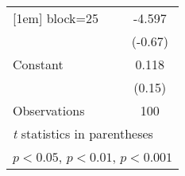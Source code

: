 {\begin{longtable}{l*{1}{c}}
[1em]
block=25            &      -4.597         \\
                    &     (-0.67)         \\
[1em]
Constant            &       0.118         \\
                    &      (0.15)         \\
\hline
Observations        &         100         \\
\hline\hline
\multicolumn{2}{l}{\footnotesize \textit{t} statistics in parentheses}\\
\multicolumn{2}{l}{\footnotesize \sym{*} \(p<0.05\), \sym{**} \(p<0.01\), \sym{***} \(p<0.001\)}\\
\end{longtable}
}
